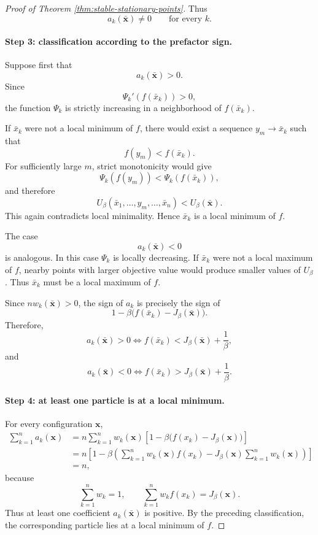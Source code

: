\documentclass{article}
\theoremstyle{plain}
\theoremstyle{definition}
\theoremstyle{remark}
\begin{document}
\begin{proof}[Proof of Theorem \ref{thm:stable-stationary-points}]
Thus
\[
    a_k(\bar{\mathbf x})\neq0 \qquad \text{for every }k.
\]

\paragraph{Step 3: classification according to the prefactor sign.}

Suppose first that
\[
    a_k(\bar{\mathbf x})>0.
\]
Since
\[
    \Psi_k'(f(\bar x_k))>0,
\]
the function \(\Psi_k\) is strictly increasing in a neighborhood of \(f(\bar x_k)\).

If \(\bar x_k\) were not a local minimum of \(f\), there would exist a sequence \(y_m\to\bar x_k\) such that
\[
    f(y_m)<f(\bar x_k).
\]
For sufficiently large \(m\), strict monotonicity would give
\[
    \Psi_k(f(y_m)) < \Psi_k(f(\bar x_k)),
\]
and therefore
\[
    U_\beta(\bar x_1,\ldots,y_m,\ldots,\bar x_n) < U_\beta(\bar{\mathbf x}).
\]
This again contradicts local minimality. Hence \(\bar x_k\) is a local minimum of \(f\).

The case
\[
    a_k(\bar{\mathbf x})<0
\]
is analogous. In this case \(\Psi_k\) is locally decreasing. If \(\bar x_k\) were not a local maximum of \(f\), nearby points with larger objective value would produce smaller values of \(U_\beta\). Thus \(\bar x_k\) must be a local maximum of \(f\).

Since \(n w_k(\bar{\mathbf x})>0\), the sign of \(a_k\) is precisely the sign of
\[
    1-\beta \bigl(f(\bar x_k)-J_\beta(\bar{\mathbf x})\bigr).
\]
Therefore,
\[
    a_k(\bar{\mathbf x})>0 \iff f(\bar x_k) < J_\beta(\bar{\mathbf x})+\frac1\beta,
\]
and
\[
    a_k(\bar{\mathbf x})<0 \iff f(\bar x_k) > J_\beta(\bar{\mathbf x})+\frac1\beta.
\]

\paragraph{Step 4: at least one particle is at a local minimum.}

For every configuration \(\mathbf x\),
\[
\begin{aligned}
    \sum_{k=1}^n a_k(\mathbf x) &= n\sum_{k=1}^n w_k(\mathbf x) \left[ 1-\beta \bigl(f(x_k)-J_\beta(\mathbf x)\bigr) \right] \\
    &= n\left[ 1-\beta \left( \sum_{k=1}^n w_k(\mathbf x)f(x_k) - J_\beta(\mathbf x) \sum_{k=1}^n w_k(\mathbf x) \right) \right] \\
    &=n,
\end{aligned}
\]
because
\[
    \sum_{k=1}^n w_k=1, \qquad \sum_{k=1}^n w_kf(x_k)=J_\beta(\mathbf x).
\]
Thus at least one coefficient \(a_k(\bar{\mathbf x})\) is positive. By the preceding classification, the corresponding particle lies at a local minimum of \(f\).
\end{proof}
\end{document}
